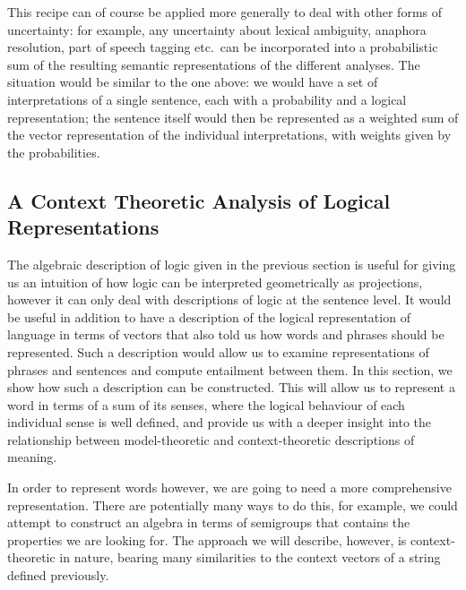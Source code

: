 This recipe can of course be applied more generally to deal with other forms of uncertainty: for example, any uncertainty about lexical ambiguity, anaphora resolution, part of speech tagging etc.~can be incorporated into a probabilistic sum of the resulting semantic representations of the different analyses. The situation would be similar to the one above: we would have a set of interpretations of a single sentence, each with a probability and a logical representation; the sentence itself would then be represented as a weighted sum of the vector representation of the individual interpretations, with weights given by the probabilities.


\subsection{A Context Theoretic Analysis of Logical Representations}
\label{context-theoretic-analysis}

The algebraic description of logic given in the previous section is useful for giving us an intuition of how logic can be interpreted geometrically as projections, however it can only deal with descriptions of logic at the sentence level. It would be useful in addition to have a description of the logical representation of language in terms of vectors that also told us how words and phrases should be represented. Such a description would allow us to  examine representations of phrases and sentences and compute entailment between them. In this section, we show how such a description can be constructed. This will allow us to represent a word in terms of a sum of its senses, where the logical behaviour of each individual sense is well defined, and provide us with a deeper insight into the relationship between model-theoretic and context-theoretic descriptions of meaning.

In order to represent words however, we are going to need a more comprehensive representation. There are potentially many ways to do this, for example, we could attempt to construct an algebra in terms of semigroups that contains the properties we are looking for. The approach we will describe, however, is context-theoretic in nature, bearing many similarities to the context vectors of a string defined previously.

